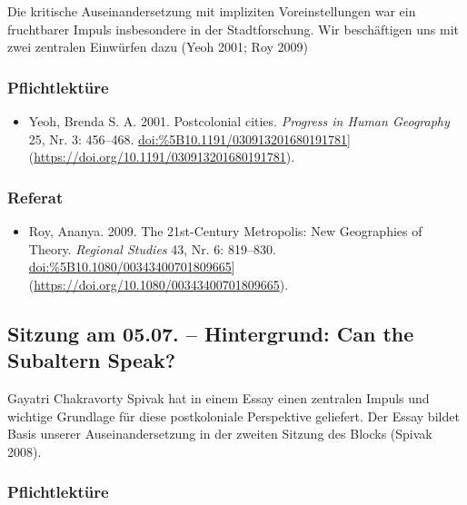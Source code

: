 \documentclass[
]{article}
\providecommand{\tightlist}{%
  \setlength{\itemsep}{0pt}\setlength{\parskip}{0pt}}
\begin{document}
Die kritische Auseinandersetzung mit impliziten Voreinstellungen war ein fruchtbarer Impuls insbesondere in der Stadtforschung. Wir beschäftigen uns mit zwei zentralen Einwürfen dazu (Yeoh 2001; Roy 2009)

\hypertarget{pflichtlektuxfcre-9}{%
\subsubsection*{Pflichtlektüre}\label{pflichtlektuxfcre-9}}

\begin{itemize}
\tightlist
\item
  Yeoh, Brenda S. A. 2001. Postcolonial cities. \emph{Progress in Human Geography} 25, Nr. 3: 456--468. \url{doi:\%5B10.1191/030913201680191781}{]}(\url{https://doi.org/10.1191/030913201680191781}).
\end{itemize}

\hypertarget{referat-9}{%
\subsubsection*{Referat}\label{referat-9}}

\begin{itemize}
\tightlist
\item
  Roy, Ananya. 2009. The 21st-Century Metropolis: New Geographies of Theory. \emph{Regional Studies} 43, Nr. 6: 819--830. \url{doi:\%5B10.1080/00343400701809665}{]}(\url{https://doi.org/10.1080/00343400701809665}).
\end{itemize}

\hypertarget{sitzung-am-05.07.-hintergrund-can-the-subaltern-speak}{%
\subsection{Sitzung am 05.07. -- Hintergrund: Can the Subaltern Speak?}\label{sitzung-am-05.07.-hintergrund-can-the-subaltern-speak}}

Gayatri Chakravorty Spivak hat in einem Essay einen zentralen Impuls und wichtige Grundlage für diese postkoloniale Perspektive geliefert. Der Essay bildet Basis unserer Auseinandersetzung in der zweiten Sitzung des Blocks (Spivak 2008).

\hypertarget{pflichtlektuxfcre-10}{%
\subsubsection*{Pflichtlektüre}\label{pflichtlektuxfcre-10}}
\end{document}
